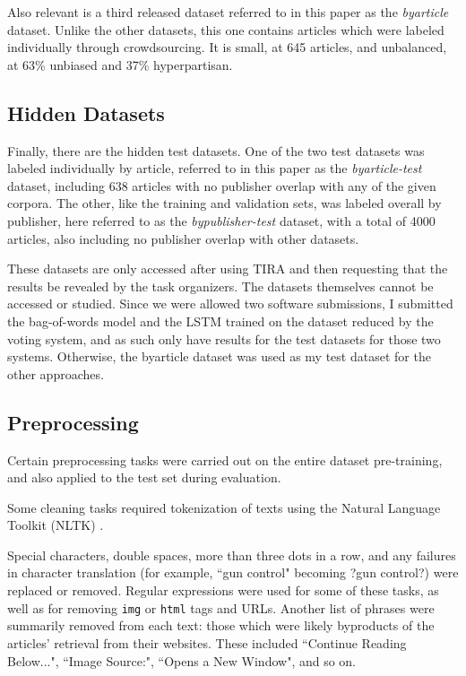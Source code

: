 \documentclass[11pt, a4paper]{article}
\begin{document}
Also relevant is a third released dataset referred to in this paper as the \textit{byarticle} dataset. Unlike the other datasets, this one contains articles which were labeled individually through crowdsourcing. It is small, at 645 articles, and unbalanced, at 63\% unbiased and 37\% hyperpartisan.

\subsection{Hidden Datasets}

Finally, there are the hidden test datasets. One of the two test datasets was labeled individually by article, referred to in this paper as the \textit{byarticle-test} dataset, including 638 articles with no publisher overlap with any of the given corpora. The other, like the training and validation sets, was labeled overall by publisher, here referred to as the \textit{bypublisher-test} dataset, with a total of 4000 articles, also including no publisher overlap with other datasets.

These datasets are only accessed after using TIRA and then requesting that the results be revealed by the task organizers. The datasets themselves cannot be accessed or studied. Since we were allowed two software submissions, I submitted the bag-of-words model and the LSTM trained on the dataset reduced by the voting system, and as such only have results for the test datasets for those two systems. Otherwise, the byarticle dataset was used as my test dataset for the other approaches.

\subsection{Preprocessing}

Certain preprocessing tasks were carried out on the entire dataset pre-training, and also applied to the test set during evaluation.

Some cleaning tasks required tokenization of texts using the Natural Language Toolkit (NLTK) \cite{bird2009nltk}.

Special characters, double spaces, more than three dots in a row, and any failures in character translation (for example, ``gun control" becoming ?gun control?) were replaced or removed. Regular expressions were used for some of these tasks, as well as for removing \texttt{img} or \texttt{html} tags and URLs. Another list of phrases were summarily removed from each text: those which were likely byproducts of the articles' retrieval from their websites. These included ``Continue Reading Below...", ``Image Source:", ``Opens a New Window", and so on.
\end{document}
